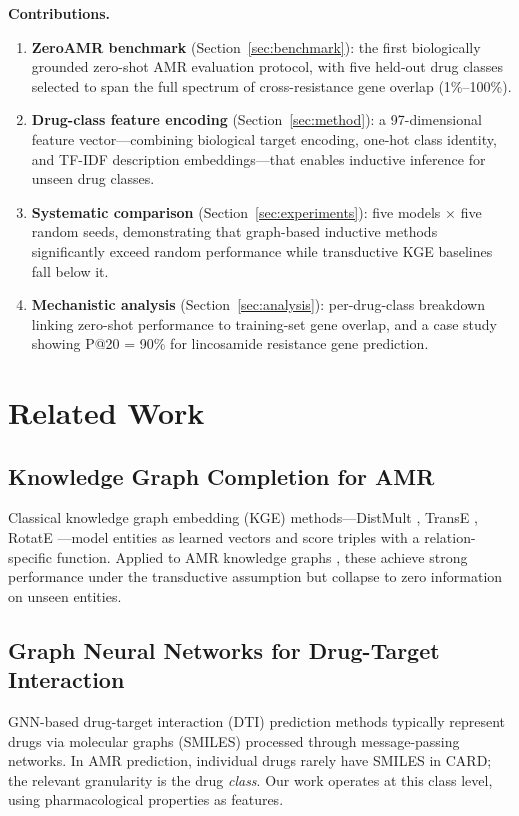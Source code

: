 \documentclass[conference]{IEEEtran}
\begin{document}
\textbf{Contributions.}
\begin{enumerate}
  \item \textbf{ZeroAMR benchmark} (Section~\ref{sec:benchmark}): the
        first biologically grounded zero-shot AMR evaluation protocol,
        with five held-out drug classes selected to span the full
        spectrum of cross-resistance gene overlap (1\%–100\%).
  \item \textbf{Drug-class feature encoding} (Section~\ref{sec:method}):
        a 97-dimensional feature vector—combining biological target
        encoding, one-hot class identity, and TF-IDF description
        embeddings—that enables inductive inference for unseen drug
        classes.
  \item \textbf{Systematic comparison} (Section~\ref{sec:experiments}):
        five models $\times$ five random seeds, demonstrating that
        graph-based inductive methods significantly exceed random
        performance while transductive KGE baselines fall below it.
  \item \textbf{Mechanistic analysis} (Section~\ref{sec:analysis}):
        per-drug-class breakdown linking zero-shot performance to
        training-set gene overlap, and a case study showing
        P@20 = 90\% for lincosamide resistance gene prediction.
\end{enumerate}


\section{Related Work}

\subsection{Knowledge Graph Completion for AMR}
Classical knowledge graph embedding (KGE) methods—DistMult
\cite{Yang2015distmult}, TransE \cite{Bordes2013transe}, RotatE
\cite{Sun2019rotate}—model entities as learned vectors and score
triples with a relation-specific function. Applied to AMR knowledge
graphs \cite{Kang2022amrkg}, these achieve strong performance under the
transductive assumption but collapse to zero information on unseen
entities.

\subsection{Graph Neural Networks for Drug-Target Interaction}
GNN-based drug-target interaction (DTI) prediction methods
\cite{Lim2019dtiGNN, Huang2020moltrans} typically represent drugs via
molecular graphs (SMILES) processed through message-passing networks.
In AMR prediction, individual drugs rarely have SMILES in CARD; the
relevant granularity is the drug \emph{class}. Our work operates at
this class level, using pharmacological properties as features.
\end{document}
